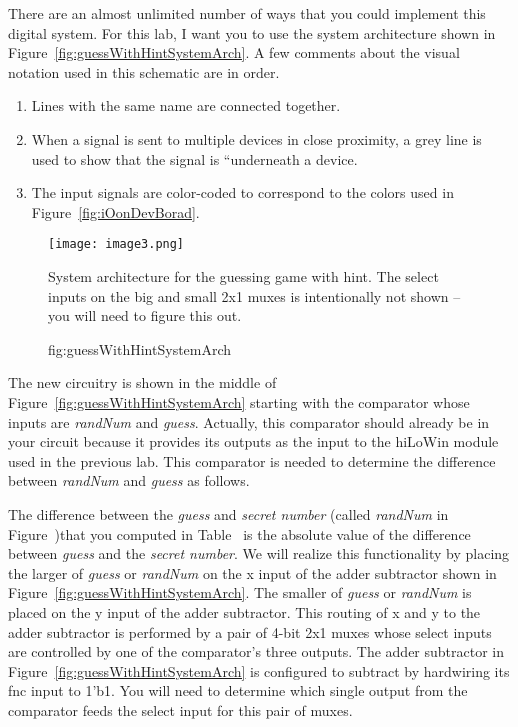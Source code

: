 
There are an almost unlimited number of ways that you could implement
this digital system. For this lab, I want you to use the system
architecture shown in Figure~\ref{fig:guessWithHintSystemArch}. A few comments about the visual notation
used in this schematic are in order.

\begin{enumerate}
\def\labelenumi{\arabic{enumi})}
\item
  Lines with the same name are connected together.
\item
  When a signal is sent to multiple devices in close proximity, a grey
  line is used to show that the signal is ``underneath a device.
\item
  The input signals are color-coded to correspond to the colors used in
  Figure~\ref{fig:iOonDevBorad}.
\end{enumerate}

\begin{figure}
\texttt{[image:  image3.png]}
\caption{System architecture for the guessing game with hint. The select
inputs on the big and small 2x1 muxes is intentionally not shown -- you
will need to figure this out.}
\caption{fig:guessWithHintSystemArch}
\end{figure}

The new circuitry is shown in the middle of Figure~\ref{fig:guessWithHintSystemArch} starting with the
comparator whose inputs are \emph{randNum} and \emph{guess}. Actually,
this comparator should already be in your circuit because it provides
its outputs as the input to the hiLoWin module used in the previous lab.
This comparator is needed to determine the difference between
\emph{randNum} and \emph{guess} as follows.

The difference between the \emph{guess} and \emph{secret number} (called
\emph{randNum} in Figure~)that you computed 
in Table~ is 
the absolute
value of the difference between \emph{guess} and the \emph{secret
number}. We will realize this functionality by placing the larger of
\emph{guess} or \emph{randNum} on the x input of the adder subtractor
shown in Figure~\ref{fig:guessWithHintSystemArch}. The smaller of \emph{guess} or \emph{randNum} is
placed on the y input of the adder subtractor. This routing of x and y
to the adder subtractor is performed by a pair of 4-bit 2x1 muxes whose
select inputs are controlled by one of the comparator's three outputs.
The adder subtractor in Figure~\ref{fig:guessWithHintSystemArch} is configured to subtract by hardwiring
its fnc input to 1'b1. You will need to determine which single output
from the comparator feeds the select input for this pair of muxes.

